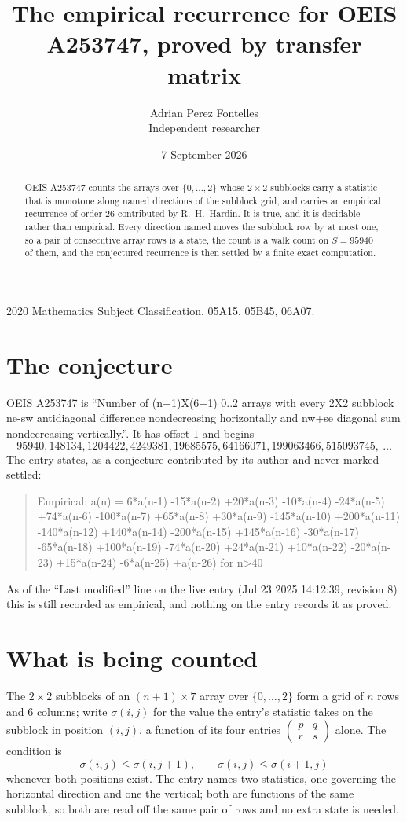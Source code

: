 \documentclass[11pt,a4paper]{article}
\title{The empirical recurrence for OEIS A253747, proved by transfer matrix}
\author{Adrian Perez Fontelles\\ \small Independent researcher}
\date{7 September 2026}
\theoremstyle{plain}
\theoremstyle{definition}
\begin{document}
\maketitle

\begin{abstract}
OEIS A253747 counts the arrays over $\{0,\dots,2\}$ whose $2\times2$ subblocks carry a
statistic that is monotone along named directions of the subblock grid, and carries an
empirical recurrence of order $26$ contributed by R.~H.~Hardin. It is true, and it is
decidable rather than empirical. Every direction named moves the subblock row by at most one,
so a pair of consecutive array rows is a state, the count is a walk count on $S=95940$ of them,
and the conjectured recurrence is then settled by a finite exact computation.
\end{abstract}

\noindent\small 2020 Mathematics Subject Classification. 05A15, 05B45, 06A07.\normalsize

\section{The conjecture}

OEIS A253747 is ``Number of (n+1)X(6+1) 0..2 arrays with every 2X2 subblock ne-sw antidiagonal difference nondecreasing horizontally and nw+se diagonal sum nondecreasing vertically.''. It has offset $1$ and begins
\[
95940, 148134, 1204422, 4249381, 19685575, 64166071, 199063466, 515093745,\ \dots
\]
The entry states, as a conjecture contributed by its author and never marked settled:
\begin{quote}
Empirical: a(n) = 6*a(n-1) -15*a(n-2) +20*a(n-3) -10*a(n-4) -24*a(n-5) +74*a(n-6) -100*a(n-7) +65*a(n-8) +30*a(n-9) -145*a(n-10) +200*a(n-11) -140*a(n-12) +140*a(n-14) -200*a(n-15) +145*a(n-16) -30*a(n-17) -65*a(n-18) +100*a(n-19) -74*a(n-20) +24*a(n-21) +10*a(n-22) -20*a(n-23) +15*a(n-24) -6*a(n-25) +a(n-26) for n>40
\end{quote}
As of the ``Last modified'' line on the live entry (Jul 23 2025 14:12:39, revision 8) this is still
recorded as empirical, and nothing on the entry records it as proved.

\section{What is being counted}

The $2\times2$ subblocks of an $(n+1)\times7$ array over $\{0,\dots,2\}$ form a grid
of $n$ rows and $6$ columns; write $\sigma(i,j)$ for the value the entry's statistic takes on
the subblock in position $(i,j)$, a function of its four entries
$\begin{pmatrix}p&q\\r&s\end{pmatrix}$ alone. The condition is
\[
\sigma(i,j)\le\sigma(i,j+1),\qquad \sigma(i,j)\le\sigma(i+1,j)
\]
whenever both positions exist. The entry names two statistics, one governing the horizontal direction and one the vertical; both are functions of the same subblock, so both are read off the same pair of rows and no extra state is needed.
\end{document}
